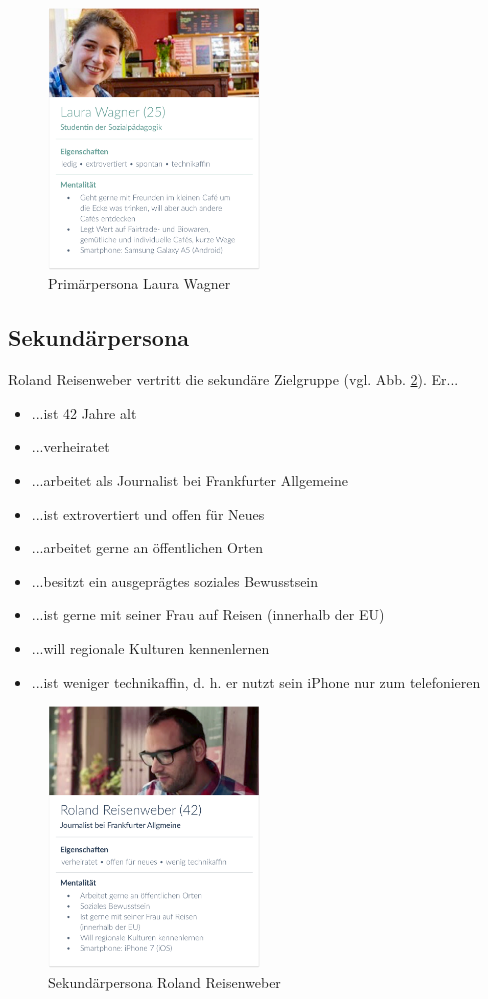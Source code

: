 \begin{figure}[h!]
    \centering
		\includegraphics[width=0.5\textwidth]{Bilder/laura.eps}
		\caption{Primärpersona Laura Wagner}
		\label{fig:laura}
\end{figure}

\subsection{Sekundärpersona}
Roland Reisenweber vertritt die sekundäre Zielgruppe (vgl. Abb. \ref{fig:roland}). Er...
\begin{itemize}
	\item ...ist 42 Jahre alt
	\item ...verheiratet
	\item ...arbeitet als Journalist bei Frankfurter Allgemeine
	\item ...ist extrovertiert und offen für Neues
	\item ...arbeitet gerne an öffentlichen Orten
	\item ...besitzt ein ausgeprägtes soziales Bewusstsein
	\item ...ist gerne mit seiner Frau auf Reisen (innerhalb der EU)
	\item ...will regionale Kulturen kennenlernen
	\item ...ist weniger technikaffin, d. h. er nutzt sein iPhone nur zum telefonieren
\end{itemize}

\begin{figure}[h!]
    \centering
		\includegraphics[width=0.5\textwidth]{Bilder/roland.eps}
		\caption{Sekundärpersona Roland Reisenweber}
		\label{fig:roland}
\end{figure}

